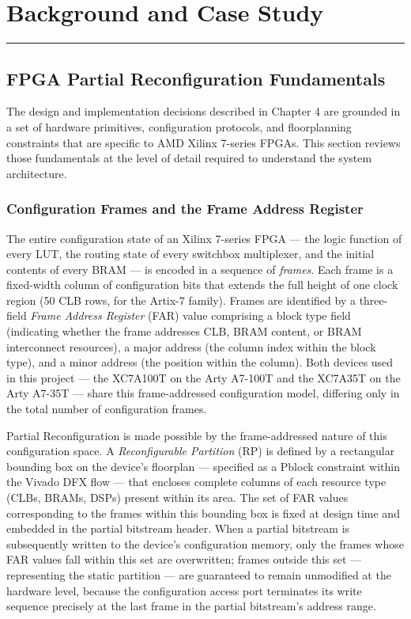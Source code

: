 \chapter{Background and Case Study}

\vspace{0.4em}\hrule\vspace{0.4em}

\section{FPGA Partial Reconfiguration Fundamentals}

The design and implementation decisions described in Chapter 4 are grounded in a set of hardware primitives, configuration protocols, and floorplanning constraints that are specific to AMD Xilinx 7-series FPGAs. This section reviews those fundamentals at the level of detail required to understand the system architecture.

\subsection{Configuration Frames and the Frame Address Register}

The entire configuration state of an Xilinx 7-series FPGA — the logic function of every LUT, the routing state of every switchbox multiplexer, and the initial contents of every BRAM — is encoded in a sequence of \textit{frames}. Each frame is a fixed-width column of configuration bits that extends the full height of one clock region (50 CLB rows, for the Artix-7 family). Frames are identified by a three-field \textit{Frame Address Register} (FAR) value comprising a block type field (indicating whether the frame addresses CLB, BRAM content, or BRAM interconnect resources), a major address (the column index within the block type), and a minor address (the position within the column). Both devices used in this project — the XC7A100T on the Arty A7-100T and the XC7A35T on the Arty A7-35T — share this frame-addressed configuration model, differing only in the total number of configuration frames.

Partial Reconfiguration is made possible by the frame-addressed nature of this configuration space. A \textit{Reconfigurable Partition} (RP) is defined by a rectangular bounding box on the device's floorplan — specified as a Pblock constraint within the Vivado DFX flow — that encloses complete columns of each resource type (CLBs, BRAMs, DSPs) present within its area. The set of FAR values corresponding to the frames within this bounding box is fixed at design time and embedded in the partial bitstream header. When a partial bitstream is subsequently written to the device's configuration memory, only the frames whose FAR values fall within this set are overwritten; frames outside this set — representing the static partition — are guaranteed to remain unmodified at the hardware level, because the configuration access port terminates its write sequence precisely at the last frame in the partial bitstream's address range.

